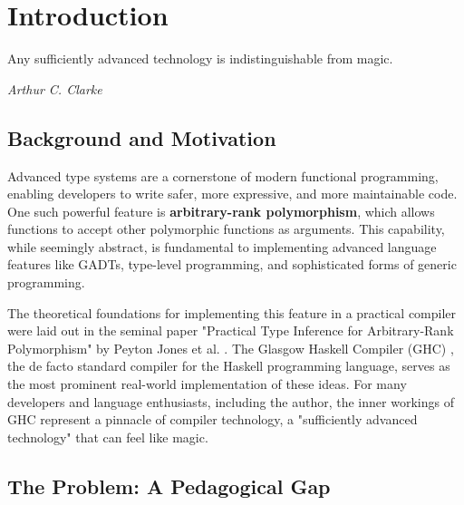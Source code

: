 \chapter{Introduction}
\label{chap:Introduction}

\epigraph{Any sufficiently advanced technology is indistinguishable from magic.}{\textit{Arthur C. Clarke}}

\section{Background and Motivation}

Advanced type systems are a cornerstone of modern functional programming, enabling developers to write safer, more expressive, and more maintainable code. One such powerful feature is \textbf{arbitrary-rank polymorphism}, which allows functions to accept other polymorphic functions as arguments. This capability, while seemingly abstract, is fundamental to implementing advanced language features like GADTs, type-level programming, and sophisticated forms of generic programming.

The theoretical foundations for implementing this feature in a practical compiler were laid out in the seminal paper "Practical Type Inference for Arbitrary-Rank Polymorphism" by Peyton Jones et al. \cite{jones-practical-2007}. The Glasgow Haskell Compiler (GHC) \cite{ghc-site-2025}, the de facto standard compiler for the Haskell programming language, serves as the most prominent real-world implementation of these ideas. For many developers and language enthusiasts, including the author, the inner workings of GHC represent a pinnacle of compiler technology, a "sufficiently advanced technology" that can feel like magic.

\section{The Problem: A Pedagogical Gap}

